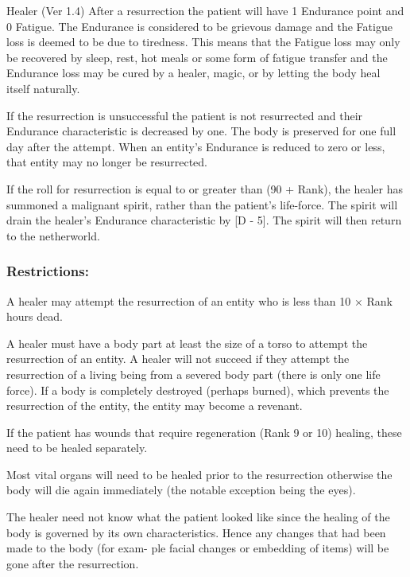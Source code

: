 \begin{Chapter}{Healer (Ver 1.4)}
After a resurrection the patient will have 1 Endurance point and 0
Fatigue.  The Endurance is considered to be grievous damage and the
Fatigue loss is deemed to be due to tiredness. This means that the
Fatigue loss may only be recovered by sleep, rest, hot meals or some
form of fatigue transfer and the Endurance loss may be cured by a
healer, magic, or by letting the body heal itself naturally.

If the resurrection is unsuccessful the patient is not resurrected and
their Endurance characteristic is decreased by one.  The body is
preserved for one full day after the attempt. When an entity’s
Endurance is reduced to zero or less, that entity may no longer be
resurrected.

If the roll for resurrection is equal to or greater than (90 + Rank),
the healer has summoned a malignant spirit, rather than the patient’s
life-force. The spirit will drain the healer’s Endurance
characteristic by [D - 5].  The spirit will then return to the
netherworld.

\subsubsection{Restrictions:}
\begin{Itemize}
\item A healer may attempt the resurrection of an entity who is less
  than 10 × Rank hours dead.

\item A healer must have a body part at least the size of a torso to
  attempt the resurrection of an entity.  A healer will not succeed if
  they attempt the resurrection of a living being from a severed body
  part (there is only one life force).  If a body is completely
  destroyed (perhaps burned), which prevents the resurrection of the
  entity, the entity may become a revenant.

\item If the patient has wounds that require regeneration (Rank 9 or
  10) healing, these need to be healed separately.

\item Most vital organs will need to be healed prior to the
  resurrection otherwise the body will die again immediately (the
  notable exception being the eyes).

\item The healer need not know what the patient looked like since the
  healing of the body is governed by its own characteristics.  Hence
  any changes that had been made to the body (for exam- ple facial
  changes or embedding of items) will be gone after the resurrection.


\end{Itemize}
\end{Chapter}
